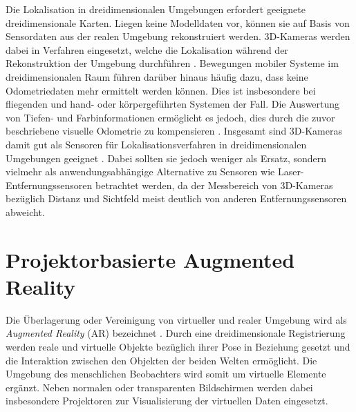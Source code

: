 Die Lokalisation in dreidimensionalen Umgebungen erfordert geeignete dreidimensionale Karten. Liegen keine Modelldaten vor, können sie auf Basis von Sensordaten aus der realen Umgebung rekonstruiert werden. 3D-Kameras werden dabei in Verfahren eingesetzt, welche die Lokalisation während der Rekonstruktion der Umgebung durchführen \cite{Durrant2006}. Bewegungen mobiler Systeme im dreidimensionalen Raum führen darüber hinaus häufig dazu, dass keine Odometriedaten mehr ermittelt werden können. Dies ist insbesondere bei fliegenden \cite{Huang2011} und hand- oder körpergeführten Systemen \cite{Fallon2012} der Fall. Die Auswertung von Tiefen- und Farbinformationen ermöglicht es jedoch, dies durch die zuvor beschriebene visuelle Odometrie zu kompensieren \cite{Whelan2013robust}. Insgesamt sind 3D-Kameras damit gut als Sensoren für Lokalisationsverfahren in dreidimensionalen Umgebungen geeignet \cite{Cunha2011} \cite{Eriksson2012}. Dabei sollten sie jedoch weniger als Ersatz, sondern vielmehr als anwendungsabhängige Alternative zu Sensoren wie Laser-Entfernungssensoren betrachtet werden, da der Messbereich von 3D-Kameras bezüglich Distanz und Sichtfeld meist deutlich von anderen Entfernungssensoren abweicht.

\section{Projektorbasierte Augmented Reality}
Die Überlagerung oder Vereinigung von virtueller und realer Umgebung wird als \textit{Augmented Reality} (AR) bezeichnet \cite{Azuma1997}. Durch eine dreidimensionale Registrierung werden reale und virtuelle Objekte bezüglich ihrer Pose in Beziehung gesetzt und die Interaktion zwischen den Objekten der beiden Welten ermöglicht. Die Umgebung des menschlichen Beobachters wird somit um virtuelle Elemente ergänzt. Neben normalen oder transparenten Bildschirmen werden dabei insbesondere Projektoren zur Visualisierung der virtuellen Daten eingesetzt.\\


